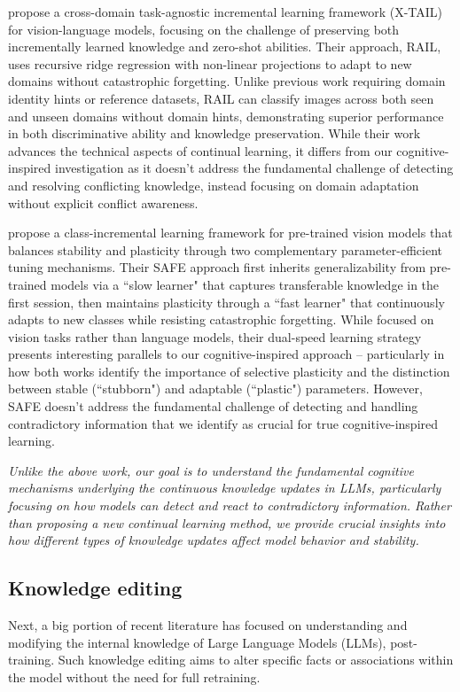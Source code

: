 \citet{xu2024advancing} propose a cross-domain task-agnostic incremental learning framework (X-TAIL) for vision-language models, focusing on the challenge of preserving both incrementally learned knowledge and zero-shot abilities. Their approach, RAIL, uses recursive ridge regression with non-linear projections to adapt to new domains without catastrophic forgetting. Unlike previous work requiring domain identity hints or reference datasets, RAIL can classify images across both seen and unseen domains without domain hints, demonstrating superior performance in both discriminative ability and knowledge preservation. While their work advances the technical aspects of continual learning, it differs from our cognitive-inspired investigation as it doesn't address the fundamental challenge of detecting and resolving conflicting knowledge, instead focusing on domain adaptation without explicit conflict awareness.

\citet{zhao2024safeslowfastparameterefficient} propose a class-incremental learning framework for pre-trained vision models that balances stability and plasticity through two complementary parameter-efficient tuning mechanisms. Their SAFE approach first inherits generalizability from pre-trained models via a ``slow learner" that captures transferable knowledge in the first session, then maintains plasticity through a ``fast learner" that continuously adapts to new classes while resisting catastrophic forgetting. While focused on vision tasks rather than language models, their dual-speed learning strategy presents interesting parallels to our cognitive-inspired approach – particularly in how both works identify the importance of selective plasticity and the distinction between stable (``stubborn") and adaptable (``plastic") parameters. However, SAFE doesn't address the fundamental challenge of detecting and handling contradictory information that we identify as crucial for true cognitive-inspired learning.

\textit{Unlike the above work, our goal is to understand the fundamental cognitive mechanisms underlying the continuous knowledge updates in LLMs, particularly focusing on how models can detect and react to contradictory information. Rather than proposing a new continual learning method, we provide crucial insights into how different types of knowledge updates affect model behavior and stability.}

\subsection{Knowledge editing}
Next, a big portion of recent literature has focused on understanding and modifying the internal knowledge of Large Language Models (LLMs), post-training. Such knowledge editing aims to alter specific facts or associations within the model without the need for full retraining. 

